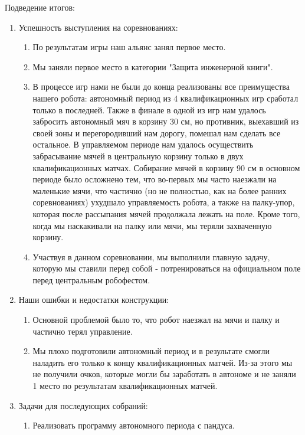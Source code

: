 Подведение итогов:
\begin{enumerate}
  \item Успешность выступления на соревнованиях:
  \begin{enumerate}
	\item По результатам игры наш альянс занял первое место.
	
	\item Мы заняли первое место в категории "Защита инженерной книги".
	
	\item В процессе игр нами не были до конца реализованы все преимущества нашего робота: автономный период из 4 квалификационных игр сработал только в последней. Также в финале в одной из игр нам удалось забросить автономный мяч в корзину 30 см, но противник, выехавший из своей зоны и перегородивший нам дорогу, помешал нам сделать все остальное. В управляемом периоде нам удалось осуществить забрасывание мячей в центральную корзину только в двух квалификационных матчах. Собирание мячей в корзину 90 см в основном периоде было осложнено тем, что во-первых мы часто наезжали на маленькие мячи, что частично (но не полностью, как на более ранних соревнованиях) ухудшало управляемость робота, а также на палку-упор, которая после рассыпания мячей продолжала лежать на поле. Кроме того, когда мы наскакивали на палку или мячи, мы теряли захваченную корзину.
	
	\item Участвуя в данном соревновании, мы выполнили главную задачу, которую мы ставили перед собой - потренироваться на официальном поле перед центральным робофестом.
	
  \end{enumerate}
  
  \item Наши ошибки и недостатки конструкции:
  \begin{enumerate}
  	\item Основной проблемой было то, что робот наезжал на мячи и палку и частично терял управление.
  	
  	\item Мы плохо подготовили автономный период и в результате смогли наладить его только к концу квалификационных матчей. Из-за этого мы не получили очков, которые могли бы заработать в автономе и не заняли 1 место по результатам квалификационных матчей.
  	
  \end{enumerate}
  
  \item Задачи для последующих собраний:
  \begin{enumerate}
  	\item Реализовать программу автономного периода с пандуса.
  	

\end{enumerate}
\end{enumerate}
